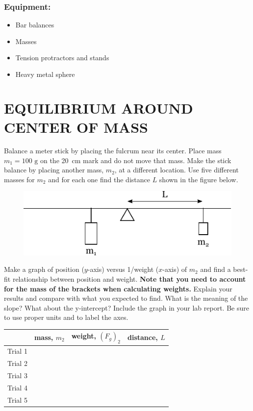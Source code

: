 \documentclass[11pt,letterpaper]{article}
\begin{document}
\subsubsection*{Equipment:}
\begin{itemize}
\setlength{\parskip}{3pt}
\item Bar balances
\item Masses
\item Tension protractors and stands
\item Heavy metal sphere
\end{itemize}

\section{EQUILIBRIUM AROUND CENTER OF MASS}
Balance a meter stick by placing the fulcrum near its center.  Place mass $m_1=100\mbox{ g}$ on the 20~cm mark and do not move that mass. Make the stick balance by placing another mass, $m_2$, at a different location. Use five different masses for $m_2$ and for each one find the distance $L$ shown in the figure below.

\begin{figure}[h]
\begin{center}
\includegraphics[]{./lab6_part1.pdf}
\end{center}
\end{figure}

Make a graph of position ($y$-axis) versus 1/weight ($x$-axis) of $m_2$ and find a best-fit relationship between position and weight. \textbf{Note that you need to account for the mass of the brackets when calculating weights.} Explain your results and compare with what you expected to find. What is the meaning of the slope? What about the y-intercept? Include the graph in your lab report. Be sure to use proper units and to label the axes.

\vspace{.5cm}

\renewcommand{\arraystretch}{1.4}
\begin{tabularx}{\linewidth}{|Y|Y|Y|Y|}
\hline
\vspace{2cm} & mass, $m_2$ & weight, $\left(F_g\right)_2$ & distance, $L$ \\
\hline Trial 1 &&&\\
\hline Trial 2 &&&\\
\hline Trial 3 &&&\\
\hline Trial 4 &&&\\
\hline Trial 5 &&&\\
\hline
\end{tabularx}\\
\end{document}
